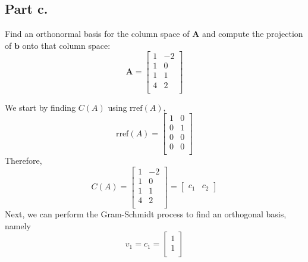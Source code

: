 \subsection{Part c.}
Find an orthonormal basis for the column space of $\mathbf{A}$ and compute
the projection of $\mathbf{b}$ onto that column space:
\begin{equation}
    \mathbf{A} =
    \begin{bmatrix}
        1       &       -2  \\
        1       &       0   \\
        1       &       1   \\
        4       &       2   \\
    \end{bmatrix}
\end{equation}
\begin{mdframed}
    We start by finding $C(A)$ using $\text{rref}(A)$,
    \begin{equation}
        \text{rref}(A) = 
        \begin{bmatrix}
            1       &       0   \\
            0       &       1   \\
            0       &       0   \\
            0       &       0   \\
        \end{bmatrix}
    \end{equation}
    Therefore,
    \begin{equation}
        C(A) =
        \begin{bmatrix}
        1       &       -2  \\
        1       &       0   \\
        1       &       1   \\
        4       &       2   \\
        \end{bmatrix}
        = 
        \begin{bmatrix}
            c_{1}   &   c_{2}
        \end{bmatrix}
    \end{equation}
    Next, we can perform the Gram-Schmidt process to find an orthogonal
    basis, namely
    \begin{equation}
        v_{1} = c_{1} =   
        \begin{bmatrix}
            1       \\
            1       \\

\end{bmatrix}
\end{equation}
\end{mdframed}
